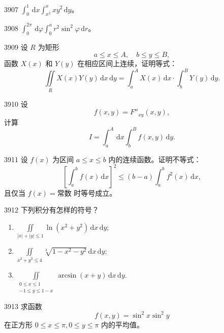 \begin{prob}[S]{3907}
$\int_{0}^{1}\,\mathrm{d}x \int_{x^2}^{x} xy^2\,\mathrm{d}y$。
\end{prob}

\begin{prob}[S]{3908}
$\int_{0}^{2\pi}\,\mathrm{d}\varphi \int_{0}^{a} r^2 \sin^2\varphi\,\mathrm{d}r$。
\end{prob}

\begin{prob}[M]{3909}
设 $R$ 为矩形
\[
a \leqslant x \leqslant A, \quad b \leqslant y \leqslant B,
\]
函数 $X(x)$ 和 $Y(y)$ 在相应区间上连续，证明等式：
\[
\iint\limits_{R} X(x)Y(y)\,\mathrm{d}x\,\mathrm{d}y = \int_{a}^{A} X(x)\,\mathrm{d}x \cdot \int_{b}^{B} Y(y)\,\mathrm{d}y.
\]
\end{prob}

\begin{prob}[M]{3910}
设
\[
f(x, y) = F''_{xy}(x, y),
\]
计算
\[
I = \int_{a}^{A}\,\mathrm{d}x \int_{b}^{B} f(x, y)\,\mathrm{d}y.
\]
\end{prob}

\begin{prob}[M]{3911}
设 $f(x)$ 为区间 $a \leqslant x \leqslant b$ 内的连续函数。证明不等式：
\[
\left[ \int_{a}^{b} f(x)\,\mathrm{d}x \right]^2 \leqslant (b - a) \int_{a}^{b} f^2(x)\,\mathrm{d}x,
\]
且仅当 $f(x) = \text{常数}$ 时等号成立。
\end{prob}

\begin{prob}[L]{3912}
下列积分有怎样的符号？
\begin{enumerate}[label=(\alph*), itemsep=2pt, topsep=3pt]
\item $\iint\limits_{|x| + |y| \leqslant 1} \ln(x^2 + y^2)\,\mathrm{d}x\,\mathrm{d}y$;
\item $\iint\limits_{x^2 + y^2 \leqslant 4} \sqrt[3]{1 - x^2 - y^2}\,\mathrm{d}x\,\mathrm{d}y$;
\item $\iint\limits_{\substack{0 \leqslant x \leqslant 1 \\ -1 \leqslant y \leqslant 1 - x}} \arcsin(x + y)\,\mathrm{d}x\,\mathrm{d}y$.
\end{enumerate}
\end{prob}

\begin{prob}[M]{3913}
求函数
\[
f(x, y) = \sin^2 x \sin^2 y
\]
在正方形 $0 \leqslant x \leqslant \pi, 0 \leqslant y \leqslant \pi$ 内的平均值。
\end{prob}


